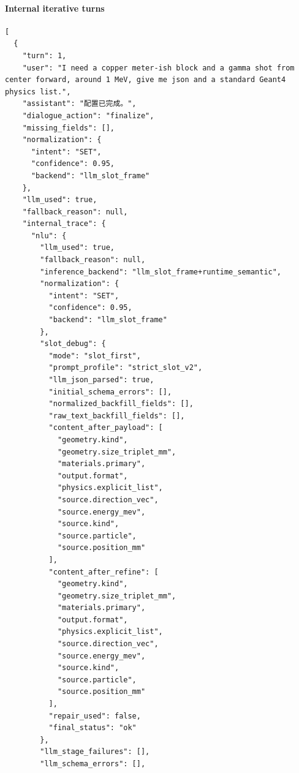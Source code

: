 \documentclass[11pt]{article}
\begin{document}
\paragraph{Internal iterative turns}
\begin{lstlisting}
[
  {
    "turn": 1,
    "user": "I need a copper meter-ish block and a gamma shot from center forward, around 1 MeV, give me json and a standard Geant4 physics list.",
    "assistant": "配置已完成。",
    "dialogue_action": "finalize",
    "missing_fields": [],
    "normalization": {
      "intent": "SET",
      "confidence": 0.95,
      "backend": "llm_slot_frame"
    },
    "llm_used": true,
    "fallback_reason": null,
    "internal_trace": {
      "nlu": {
        "llm_used": true,
        "fallback_reason": null,
        "inference_backend": "llm_slot_frame+runtime_semantic",
        "normalization": {
          "intent": "SET",
          "confidence": 0.95,
          "backend": "llm_slot_frame"
        },
        "slot_debug": {
          "mode": "slot_first",
          "prompt_profile": "strict_slot_v2",
          "llm_json_parsed": true,
          "initial_schema_errors": [],
          "normalized_backfill_fields": [],
          "raw_text_backfill_fields": [],
          "content_after_payload": [
            "geometry.kind",
            "geometry.size_triplet_mm",
            "materials.primary",
            "output.format",
            "physics.explicit_list",
            "source.direction_vec",
            "source.energy_mev",
            "source.kind",
            "source.particle",
            "source.position_mm"
          ],
          "content_after_refine": [
            "geometry.kind",
            "geometry.size_triplet_mm",
            "materials.primary",
            "output.format",
            "physics.explicit_list",
            "source.direction_vec",
            "source.energy_mev",
            "source.kind",
            "source.particle",
            "source.position_mm"
          ],
          "repair_used": false,
          "final_status": "ok"
        },
        "llm_stage_failures": [],
        "llm_schema_errors": [],

\end{lstlisting}
\end{document}
